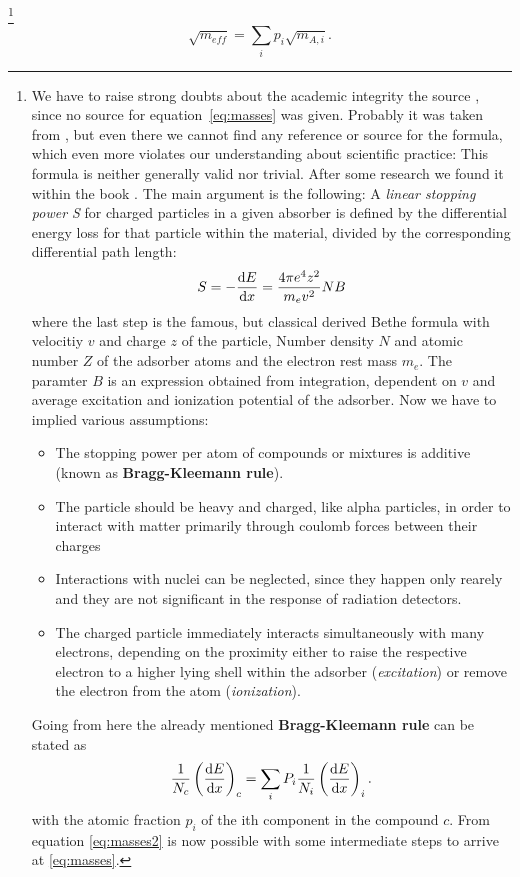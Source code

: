 \footnote{%
    We have to raise strong doubts about the academic integrity the source \cite{ver}, since no source for equation~\ref{eq:masses} was given.
    Probably it was taken from \cite{staatsexamen}, but even there we cannot find any reference or source for the formula, which even more violates our
    understanding about scientific practice: This formula is neither generally valid nor trivial. 
    After some research we found it within the book \cite{knoll2000radiation}. The main argument is the following: A \textit{linear stopping power S} for
    charged particles in a given absorber is defined by the differential energy loss for that particle within the material, divided by the corresponding
    differential path length:
    \begin{equation}
    S = - \frac{\mathrm{d} E}{\mathrm{d} x} = \frac{4 \pi e^4 z^2}{m_e v^2} N B 
    \end{equation}
    where the last step is the famous, but classical derived Bethe formula with velocitiy $v$ and charge $z$ of the particle, Number density $N$ and atomic number $Z$
    of the adsorber atoms and the electron rest mass $m_e$. The paramter $B$ is an expression obtained from integration, dependent on $v$ and average excitation and
    ionization potential of the adsorber. Now we have to implied various assumptions:
    \begin{itemize}
    \item The stopping power per atom of compounds or mixtures is additive (known as \textbf{Bragg-Kleemann rule}).
    \item The particle should be heavy and charged, like alpha particles, in order to interact with matter primarily through coulomb forces
    between their charges
    \item Interactions with nuclei can be neglected, since they happen only rearely and they are not significant in the response of radiation detectors.
    \item The charged particle immediately interacts simultaneously with many electrons, depending on the proximity either to raise the respective electron to
    a higher lying shell within the adsorber (\textit{excitation}) or remove the electron from the atom (\textit{ionization}).
    \end{itemize}
    Going from here the already mentioned \textbf{Bragg-Kleemann rule} can be stated as
    \begin{equation}
    \frac{1}{N_c}\left (\frac{\mathrm{d} E}{\mathrm{d} x} \right )_c = \sum_i P_i  \frac{1}{N_i}\left (\frac{\mathrm{d} E}{\mathrm{d} x} \right )_i.
    \label{eq:masses2}
    \end{equation}
    with the atomic fraction $p_i$ of the ith component in the compound $c$. From equation \eqref{eq:masses2} is now possible with some
    intermediate steps to arrive at \eqref{eq:masses}.
} 
\begin{equation}
\sqrt{m_{eff}} = \sum_i p_i \sqrt{m_{A,i}} .
\label{eq:masses}
\end{equation}

